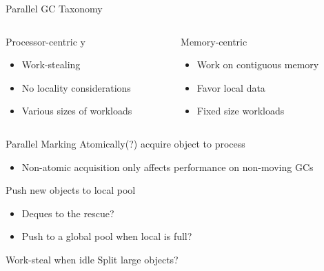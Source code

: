 \documentclass[
14pt,
aspectratio=169,
usenames,
dvipsnames,
x11names]{beamer}
\begin{document}
\begin{frame}{Parallel GC Taxonomy}
  \begin{columns}
    \begin{column}{.5\linewidth}
      \begin{alertblock}{Processor-centric \color{myyellow}y}
        \begin{itemize}
        \item Work-stealing
        \item No locality considerations
        \item Various sizes of workloads
        \end{itemize}
      \end{alertblock}
    \end{column}
    \begin{column}{.5\linewidth}
      \begin{alertblock}{Memory-centric}
        \begin{itemize}
        \item Work on contiguous memory
        \item Favor local data
        \item Fixed size workloads
        \end{itemize}
      \end{alertblock}
    \end{column}
  \end{columns}
\end{frame}

\begin{frame}{Parallel Marking}
  \alert{Atomically(?)} acquire object to process
  \begin{itemize}
  \item Non-atomic acquisition only affects performance on non-moving GCs
  \end{itemize}
  \vfill
  Push new objects to \alert{local pool}
  \begin{itemize}
  \item Deques to the rescue?
  \item Push to a global pool when local is full?
  \end{itemize}
  \vfill
  \alert{Work-steal} when idle
  \vfill
  \alert{Split} large objects?
\end{frame}
\end{document}
